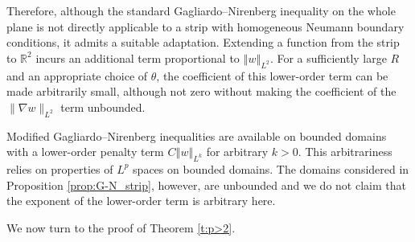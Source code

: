 \documentclass[final,11pt]{article}
\theoremstyle{definition} %
\newcommand{\lv}{\left\Vert}
\newcommand{\rv}{\right\Vert}
\theoremstyle{plain}
\theoremstyle{definition} %
\theoremstyle{remark}
\begin{document}
Therefore, although the standard Gagliardo--Nirenberg inequality on the whole plane is not directly applicable to a strip with homogeneous Neumann boundary conditions, it admits a suitable adaptation. Extending a function from the strip to $\mathbb{R}^2$ incurs an additional term proportional to $\lv w\rv_{L^2}$. For a sufficiently large $R$ and  an appropriate choice of $\theta$, the coefficient of this lower-order term can be made arbitrarily small, although not zero without making the coefficient of the $\|\nabla w\|_{L^2}$ term unbounded. 

Modified Gagliardo--Nirenberg inequalities are available on bounded domains with a lower-order penalty term $C\lv w\rv_{L^k}$ for arbitrary $k>0$. This arbitrariness relies on properties of $L^p$ spaces on bounded domains. The domains considered in Proposition \ref{prop:G-N_strip}, however, are unbounded and we do not claim that the exponent of the lower-order term is arbitrary here. 

We now turn to the proof of Theorem \ref{t:p>2}. 
\end{document}
